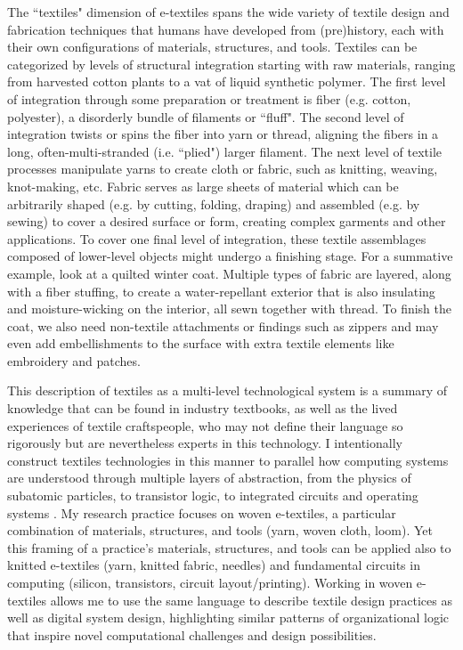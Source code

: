 The ``textiles" dimension of e-textiles spans the wide variety of textile design and fabrication techniques that humans have developed from (pre)history, each with their own configurations of materials, structures, and tools. Textiles can be categorized by levels of structural integration starting with raw materials, ranging from harvested cotton plants to a vat of liquid synthetic polymer. \cite{horrocks_handbook_2016,engineers_complete_2017} The first level of integration through some preparation or treatment is fiber (e.g. cotton, polyester), a disorderly bundle of filaments or ``fluff". The second level of integration twists or spins the fiber into yarn or thread, aligning the fibers in a long, often-multi-stranded (i.e. ``plied") larger filament. The next level of textile processes manipulate yarns to create cloth or fabric, such as knitting, weaving, knot-making, etc. Fabric serves as large sheets of material which can be arbitrarily shaped (e.g. by cutting, folding, draping) and assembled (e.g. by sewing) to cover a desired surface or form, creating complex garments and other applications. To cover one final level of integration, these textile assemblages composed of lower-level objects might undergo a finishing stage. For a summative example, look at a quilted winter coat. Multiple types of fabric are layered, along with a fiber stuffing, to create a water-repellant exterior that is also insulating and moisture-wicking on the interior, all sewn together with thread. To finish the coat, we also need non-textile attachments or findings such as zippers and may even add embellishments to the surface with extra textile elements like embroidery and patches.

This description of textiles as a multi-level technological system is a summary of knowledge that can be found in industry textbooks, as well as the lived experiences of textile craftspeople, who may not define their language so rigorously but are nevertheless experts in this technology. I intentionally construct textiles technologies in this manner to parallel how computing systems are understood through multiple layers of abstraction, from the physics of subatomic particles, to transistor logic, to integrated circuits and operating systems \cite{harris_digital_2012}. My research practice focuses on woven e-textiles, a particular combination of materials, structures, and tools (yarn, woven cloth, loom). Yet this framing of a practice's materials, structures, and tools can be applied also to knitted e-textiles (yarn, knitted fabric, needles) and fundamental circuits in computing (silicon, transistors, circuit layout/printing). Working in woven e-textiles allows me to use the same language to describe textile design practices as well as digital system design, highlighting similar patterns of organizational logic that inspire novel computational challenges and design possibilities.

